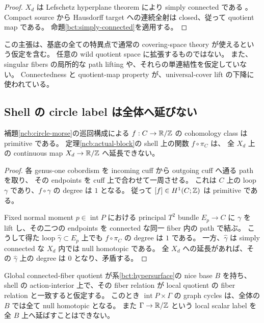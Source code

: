 \begin{proof}
$X_d$ は Lefschetz hyperplane theorem により simply connected である
\cite[Corollary 2.3.4]{achinger-lefschetz-gc}。
Compact source から Hausdorff target への連続全射は closed、従って quotient map である。
命題\ref{bct:simply-connected}を適用する。
\end{proof}

この主張は、基底の全ての特異点で通常の covering-space theory が使えるという仮定を含む。
任意の wild quotient space に拡張するものではない。
また、singular fibers の局所的な path lifting や、それらの単連結性を仮定していない。
Connectedness と quotient-map property が、universal-cover lift の下降に使われている。

\subsection{Shell の circle label は全体へ延びない}

\begin{proposition}
\label{bct:circle-label}
補題\ref{ncb:circle-morse}の巡回構成による $f:C\to\mathbb R/\mathbb Z$ の cohomology class は primitive である。
定理\ref{ncb:actual-block}の shell 上の関数 $f\circ\pi_C$ は、
全 $X_d$ 上の continuous map $X_d\to\mathbb R/\mathbb Z$ へ延長できない。
\end{proposition}

\begin{proof}
各 genus-one cobordism を incoming cuff から outgoing cuff へ通る path を取り、
その endpoints を cuff 上で合わせて一周させる。
これは $C$ 上の loop $\gamma$ であり、$f\circ\gamma$ の degree は $1$ となる。
従って $[f]\in H^1(C;\mathbb Z)$ は primitive である。

Fixed normal moment $p\in\operatorname{int}P$ における principal $T^2$ bundle $E_p\to C$ に
$\gamma$ を lift し、その二つの endpoints を connected な同一 fiber 内の path で結ぶ。
こうして得た loop $\widehat\gamma\subset E_p$ 上でも $f\circ\pi_C$ の degree は $1$ である。
一方、$\widehat\gamma$ は simply connected な $X_d$ 内では null homotopic である。
全 $X_d$ への延長があれば、その $\widehat\gamma$ 上の degree は $0$ となり、矛盾する。
\end{proof}

\begin{corollary}\label{bct:graph-cycles}
Global connected-fiber quotient が系\ref{bct:hypersurface}の nice base $B$ を持ち、
shell の action-interior 上で、その fiber relation が local quotient の fiber relation と一致すると仮定する。
このとき $\operatorname{int}P\times\Gamma$ の graph cycles は、全体の $B$ では全て null homotopic となる。
また $\Gamma\to\mathbb R/\mathbb Z$ という local scalar label を全 $B$ 上へ延ばすことはできない。
\end{corollary}

